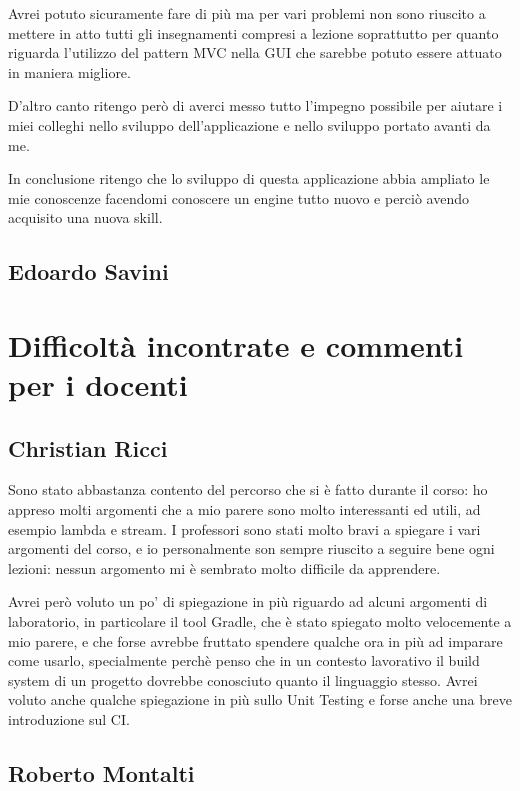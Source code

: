 \documentclass[a4paper,12pt]{report}
\begin{document}
Avrei potuto sicuramente fare di più ma per vari problemi non sono riuscito a mettere in atto tutti gli insegnamenti compresi a lezione soprattutto per quanto riguarda l'utilizzo del pattern MVC nella GUI che sarebbe potuto essere attuato in maniera migliore.

D'altro canto ritengo però di averci messo tutto l'impegno possibile per aiutare i miei colleghi nello sviluppo dell'applicazione e nello sviluppo portato avanti da me.

In conclusione ritengo che lo sviluppo di questa applicazione abbia ampliato le mie conoscenze facendomi conoscere un engine tutto nuovo e perciò avendo acquisito una nuova skill.

\subsection{Edoardo Savini}

\section{Difficoltà incontrate e commenti per i docenti}

\subsection{Christian Ricci}

Sono stato abbastanza contento del percorso che si è fatto durante il corso: ho appreso molti argomenti che a mio parere sono molto interessanti ed utili, ad esempio lambda e stream. I professori sono stati molto bravi a spiegare i vari argomenti del corso, e io personalmente son sempre riuscito a seguire bene ogni lezioni: nessun argomento mi è sembrato molto difficile da apprendere.

Avrei però voluto un po' di spiegazione in più riguardo ad alcuni argomenti di laboratorio, in particolare il tool Gradle, che è stato spiegato molto velocemente a mio parere, e che forse avrebbe fruttato spendere qualche ora in più ad imparare come usarlo, specialmente perchè penso che in un contesto lavorativo il build system di un progetto dovrebbe conosciuto quanto il linguaggio stesso. Avrei voluto anche qualche spiegazione in più sullo Unit Testing e forse anche una breve introduzione sul CI.

\subsection{Roberto Montalti}
\end{document}
